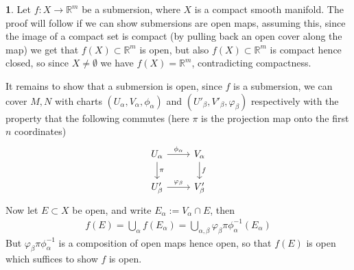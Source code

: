 \documentclass[10.5pt]{article}
\theoremstyle{definition}
\newtheorem{pb}{}
\begin{document}
    \begin{pb}
        Let \(f: X \to \mathbb{R}^m\) be a submersion, where \(X\) is a compact smooth manifold. The proof will follow if we can show submersions are open maps, assuming this, since the image of a compact set is compact (by pulling back an open cover along the map) we get that \(f(X) \subset \mathbb{R}^m\) is open, but also \(f(X) \subset \mathbb{R}^m\) is compact hence closed, so since \(X \neq \emptyset\) we have \(f(X) = \mathbb{R}^m\), contradicting compactness.

        It remains to show that a submersion is open, since \(f\) is a submersion, we can cover \(M,N\) with charts \((U_\alpha,V_\alpha,\phi_\alpha)\) and \((U'_\beta,V'_\beta,\varphi_\beta)\) respectively with the property that the following commutes (here \(\pi\) is the projection map onto the first \(n\) coordinates)
        \begin{equation*}
            \begin{tikzcd}
                U_\alpha \arrow[d,"\pi"] \arrow[r,"\phi_\alpha"] &V_\alpha \arrow[d,"f"]\\
                U_\beta' \arrow[r,"\varphi_\beta"] &V_\beta'
            \end{tikzcd}
        \end{equation*}
        Now let \(E \subset X\) be open, and write \(E_\alpha := V_\alpha \cap E\), then
        \begin{align*}
            f(E) = \bigcup_\alpha f(E_\alpha) = \bigcup_{\alpha,\beta} \varphi_\beta\pi\phi_\alpha^{-1}(E_\alpha)
        \end{align*}
        But \(\varphi_\beta\pi\phi_\alpha^{-1}\) is a composition of open maps hence open, so that \(f(E)\) is open which suffices to show \(f\) is open.
    \end{pb}
\end{document}
